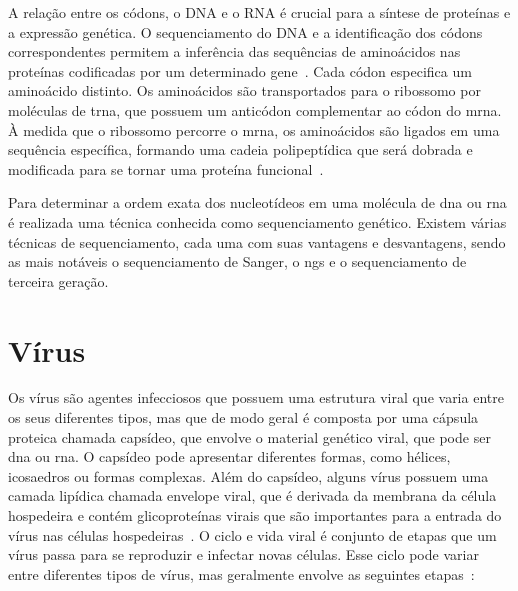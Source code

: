 A relação entre os códons, o DNA e o RNA é crucial para a síntese de proteínas e a expressão genética. O sequenciamento do DNA e a identificação dos códons correspondentes permitem a inferência das sequências de aminoácidos nas proteínas codificadas por um determinado gene~\cite{alberts_biologia_2017}.
Cada códon especifica um aminoácido distinto. Os aminoácidos são transportados para o ribossomo por moléculas de \gls{trna}, que possuem um anticódon complementar ao códon do \gls{mrna}. À medida que o ribossomo percorre o \gls{mrna}, os aminoácidos são ligados em uma sequência específica, formando uma cadeia polipeptídica que será dobrada e modificada para se tornar uma proteína funcional~\cite{alberts_biologia_2017}.

Para determinar a ordem exata dos nucleotídeos em uma molécula de \gls{dna} ou \gls{rna} é realizada uma técnica conhecida como sequenciamento genético. Existem várias técnicas de sequenciamento, cada uma com suas vantagens e desvantagens, sendo as mais notáveis o sequenciamento de Sanger, o \gls{ngs} e o sequenciamento de terceira geração.~\cite{nanopore_sequence_jain_2016,dna_sequence_sanger_1977,next_generation_sequence_goodwin_2016}

\section{Vírus}

Os vírus são agentes infecciosos que possuem uma estrutura viral que varia entre os seus diferentes tipos, mas que de modo geral é composta por uma cápsula proteica chamada capsídeo, que envolve o material genético viral, que pode ser \gls{dna} ou \gls{rna}. O capsídeo pode apresentar diferentes formas, como hélices, icosaedros ou formas complexas. Além do capsídeo, alguns vírus possuem uma camada lipídica chamada envelope viral, que é derivada da membrana da célula hospedeira e contém glicoproteínas virais que são importantes para a entrada do vírus nas células hospedeiras~\cite{david_virology_2022}.
O ciclo e vida viral é conjunto de etapas que um vírus passa para se reproduzir e infectar novas células. Esse ciclo pode variar entre diferentes tipos de vírus, mas geralmente envolve as seguintes etapas~\cite{alberts_molecular_2002}:

